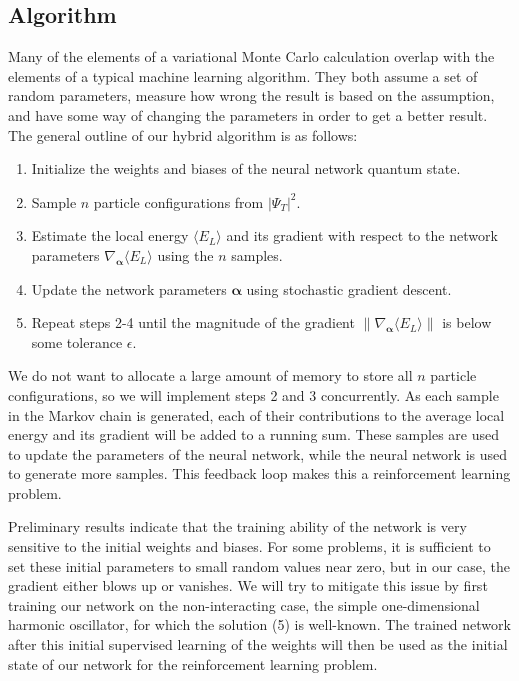 \documentclass[prb,aps,twocolumn,showpacs,10pt]{revtex4-1}
\begin{document}

\subsection{Algorithm}

Many of the elements of a variational Monte Carlo calculation overlap with the elements of a typical machine learning algorithm. They both assume a set of random parameters, measure how wrong the result is based on the assumption, and have some way of changing the parameters in order to get a better result. The general outline of our hybrid algorithm is as follows:
\begin{enumerate}
\item Initialize the weights and biases of the neural network quantum state. 
\item Sample $n$ particle configurations from $|\Psi_T|^2$.
\item Estimate the local energy $\langle E_L \rangle$ and its gradient with respect to the network parameters $\nabla_{\bm{\alpha}} \langle E_L \rangle$ using the $n$ samples.
\item Update the network parameters $\bm{\alpha}$ using stochastic gradient descent. 
\item Repeat steps 2-4 until the magnitude of the gradient $\| \nabla_{\bm{\alpha}} \langle E_L \rangle \| $ is below some tolerance $\epsilon$. 
\end{enumerate}


We do not want to allocate a large amount of memory to store all $n$ particle configurations, so we will implement steps 2 and 3 concurrently. As each sample in the Markov chain is generated, each of their contributions to the average local energy and its gradient will be added to a running sum. These samples are used to update the parameters of the neural network, while the neural network is used to generate more samples. This feedback loop makes this a reinforcement learning problem. 

Preliminary results indicate that the training ability of the network is very sensitive to the initial weights and biases. For some problems, it is sufficient to set these initial parameters to small random values near zero, but in our case, the gradient either blows up or vanishes. We will try to mitigate this issue by first training our network on the non-interacting case, the simple one-dimensional harmonic oscillator, for which the solution (5) is well-known. The trained network after this initial supervised learning of the weights will then be used as the initial state of our network for the reinforcement learning problem. 
\end{document}
